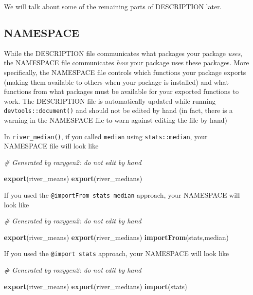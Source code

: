 \documentclass[
]{book}
\newenvironment{Shaded}{\begin{snugshade}}{\end{snugshade}}
\newcommand{\CommentTok}[1]{\textcolor[rgb]{0.56,0.35,0.01}{\textit{#1}}}
\newcommand{\KeywordTok}[1]{\textcolor[rgb]{0.13,0.29,0.53}{\textbf{#1}}}
\newcommand{\NormalTok}[1]{#1}
\begin{document}
We will talk about some of the remaining parts of DESCRIPTION later.

\hypertarget{namespace}{%
\subsection{NAMESPACE}\label{namespace}}

While the DESCRIPTION file communicates what packages your package \emph{uses}, the NAMESPACE file communicates \emph{how} your package uses these packages. More specifically, the NAMESPACE file controls which functions your package exports (making them available to others when your package is installed) and what functions from what packages must be available for your exported functions to work. The DESCRIPTION file is automatically updated while running \texttt{devtools::document()} and should not be edited by hand (in fact, there is a warning in the NAMESPACE file to warn against editing the file by hand)

In \texttt{river\_median()}, if you called \texttt{median} using \texttt{stats::median}, your NAMESPACE file will look like

\begin{Shaded}
\begin{Highlighting}[]
\CommentTok{# Generated by roxygen2: do not edit by hand}

\KeywordTok{export}\NormalTok{(river_means)}
\KeywordTok{export}\NormalTok{(river_medians)}
\end{Highlighting}
\end{Shaded}

If you used the \texttt{@importFrom\ stats\ median} approach, your NAMESPACE will look like

\begin{Shaded}
\begin{Highlighting}[]
\CommentTok{# Generated by roxygen2: do not edit by hand}

\KeywordTok{export}\NormalTok{(river_means)}
\KeywordTok{export}\NormalTok{(river_medians)}
\KeywordTok{importFrom}\NormalTok{(stats,median)}
\end{Highlighting}
\end{Shaded}

If you used the \texttt{@import\ stats} approach, your NAMESPACE will look like

\begin{Shaded}
\begin{Highlighting}[]
\CommentTok{# Generated by roxygen2: do not edit by hand}

\KeywordTok{export}\NormalTok{(river_means)}
\KeywordTok{export}\NormalTok{(river_medians)}
\KeywordTok{import}\NormalTok{(stats)}
\end{Highlighting}
\end{Shaded}
\end{document}
